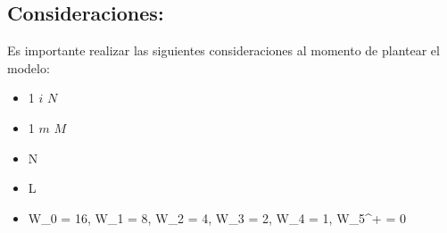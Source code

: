 \subsection{Consideraciones:}
Es importante realizar las siguientes consideraciones al momento de plantear el modelo:
\begin{center}
    \begin{itemize}
        \item 1 \leq $i$ \leq $N$ 
    \end{itemize}
\end{center}
\begin{center}
    \begin{itemize}
        \item 1 \leq $m$ \leq $M$
    \end{itemize}
\end{center}
\begin{center}
    \begin{itemize}
        \item N 
    \end{itemize}
\end{center}
\begin{center}
    \begin{itemize}
       \item L 
    \end{itemize}
\end{center}
\begin{center}
    \begin{itemize}
       \item W_{0} = 16, W_{1} = 8, W_{2} = 4, W_{3} = 2, W_{4} = 1, W_{5^+} = 0 
    \end{itemize}
\end{center}

